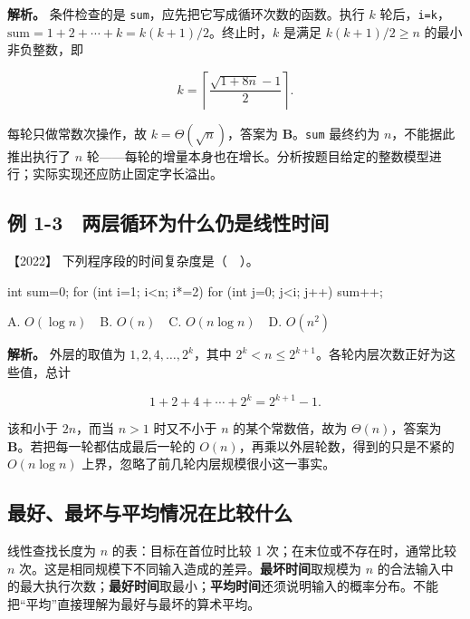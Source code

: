 \textbf{解析。} 条件检查的是 \texttt{sum}，应先把它写成循环次数的函数。执行 \(k\) 轮后，\texttt{i=\allowbreak{}k}，\(\mathrm{sum}=1+2+\cdots+k=k(k+1)/2\)。终止时，\(k\) 是满足 \(k(k+1)/2\ge n\) 的最小非负整数，即

\[k=\left\lceil\frac{\sqrt{1+8n}-1}{2}\right\rceil.\]

每轮只做常数次操作，故 \(k=\Theta(\sqrt n)\)，答案为 \textbf{B}。\texttt{sum} 最终约为 \(n\)，不能据此推出执行了 \(n\) 轮------每轮的增量本身也在增长。分析按题目给定的整数模型进行；实际实现还应防止固定字长溢出。

\subsection{例 1-3　两层循环为什么仍是线性时间}\label{DS01-ex3}

{\begin{example}[配套例题]

【2022】 下列程序段的时间复杂度是（　）。

\par\medskip\noindent\begin{minipage}{\linewidth}
\begin{codeblock}[language=C]
int sum=0;
for (int i=1; i<n; i*=2)
    for (int j=0; j<i; j++)
        sum++;
\end{codeblock}
\end{minipage}\par\medskip

A. \(O(\log n)\)　B. \(O(n)\)　C. \(O(n\log n)\)　D. \(O(n^2)\)

\end{example}}

\textbf{解析。} 外层的取值为 \(1,2,4,\ldots,2^k\)，其中 \(2^k<n\le2^{k+1}\)。各轮内层次数正好为这些值，总计

\[1+2+4+\cdots+2^k=2^{k+1}-1.\]

该和小于 \(2n\)，而当 \(n>1\) 时又不小于 \(n\) 的某个常数倍，故为 \(\Theta(n)\)，答案为 \textbf{B}。若把每一轮都估成最后一轮的 \(O(n)\)，再乘以外层轮数，得到的只是不紧的 \(O(n\log n)\) 上界，忽略了前几轮内层规模很小这一事实。

\subsection{最好、最坏与平均情况在比较什么}\label{DS01-detail2}

线性查找长度为 \(n\) 的表：目标在首位时比较 1 次；在末位或不存在时，通常比较 \(n\) 次。这是相同规模下不同输入造成的差异。\textbf{最坏时间}取规模为 \(n\) 的合法输入中的最大执行次数；\textbf{最好时间}取最小；\textbf{平均时间}还须说明输入的概率分布。不能把``平均''直接理解为最好与最坏的算术平均。


